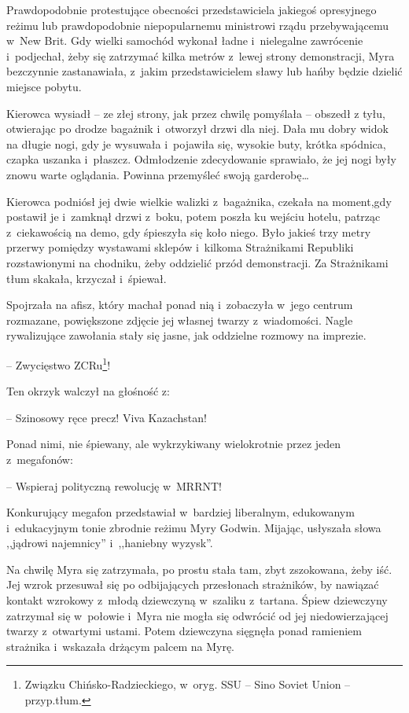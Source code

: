 \documentclass[oneside,polish,11pt,sfheadings]{mwbk}
\begin{document}
Prawdopodobnie protestujące obecności przedstawiciela jakiegoś
opresyjnego reżimu lub prawdopodobnie niepopularnemu ministrowi rządu
przebywającemu w~New Brit. Gdy wielki samochód wykonał ładne i~nielegalne zawrócenie i~podjechał, żeby się zatrzymać kilka metrów z~lewej strony demonstracji, Myra bezczynnie zastanawiała, z~jakim
przedstawicielem sławy lub hańby będzie dzielić miejsce pobytu.

Kierowca wysiadł -- ze złej strony, jak przez chwilę pomyślała -- obszedł
z tyłu, otwierając po drodze bagażnik i~otworzył drzwi dla niej. Dała mu
dobry widok na długie nogi, gdy je wysuwała i~pojawiła się, wysokie
buty, krótka spódnica, czapka uszanka i~płaszcz. Odmłodzenie
zdecydowanie sprawiało, że jej nogi były znowu warte oglądania. Powinna
przemyśleć swoją garderobę\ldots

Kierowca podniósł jej dwie wielkie walizki z~bagażnika, czekała na
moment,gdy postawił je i~zamknął drzwi z~boku, potem poszła ku wejściu
hotelu, patrząc z~ciekawością na demo, gdy śpieszyła się koło niego.
Było jakieś trzy metry przerwy pomiędzy wystawami sklepów i~kilkoma
Strażnikami Republiki rozstawionymi na chodniku, żeby oddzielić przód
demonstracji. Za Strażnikami tłum skakała, krzyczał i~śpiewał.

Spojrzała na afisz, który machał ponad nią i~zobaczyła w~jego centrum
rozmazane, powiększone zdjęcie jej własnej twarzy z~wiadomości. Nagle
rywalizujące zawołania stały się jasne, jak oddzielne rozmowy na
imprezie.

-- Zwycięstwo ZCRu\footnote{Związku Chińsko-Radzieckiego, w~oryg. SSU -- Sino
Soviet Union -- przyp.tłum.}!

Ten okrzyk walczył na głośność z: 

-- Szinosowy ręce precz! Viva
Kazachstan!

Ponad nimi, nie śpiewany, ale wykrzykiwany wielokrotnie przez jeden z~megafonów: 

-- Wspieraj polityczną rewolucję w~MRRNT!

Konkurujący megafon przedstawiał w~bardziej liberalnym, edukowanym i~edukacyjnym tonie zbrodnie reżimu Myry Godwin. Mijając, usłyszała słowa
,,jądrowi najemnicy'' i~,,haniebny wyzysk''.

Na chwilę Myra się zatrzymała, po prostu stała tam, zbyt zszokowana,
żeby iść. Jej wzrok przesuwał się po odbijających przesłonach
strażników, by nawiązać kontakt wzrokowy z~młodą dziewczyną w~szaliku z~tartana. Śpiew dziewczyny zatrzymał się w~połowie i~Myra nie mogła się
odwrócić od jej niedowierzającej twarzy z~otwartymi ustami. Potem
dziewczyna sięgnęła ponad ramieniem strażnika i~wskazała drżącym palcem
na Myrę.
\end{document}
